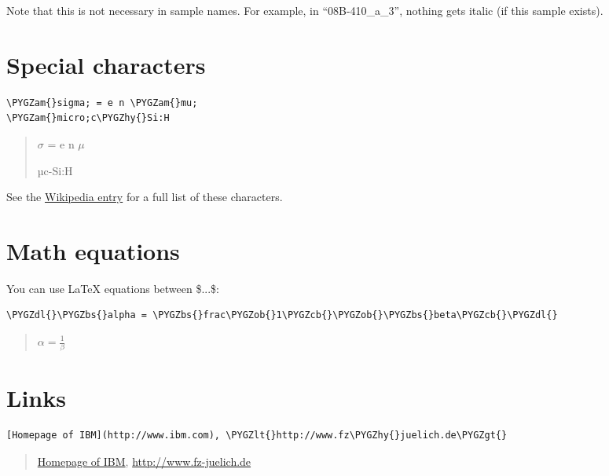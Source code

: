 \documentclass[a4paper,11pt,english]{sphinxmanual}
\def\PYGZbs{\char`\\}
\def\PYGZob{\char`\{}
\def\PYGZcb{\char`\}}
\def\PYGZam{\char`\&}
\def\PYGZlt{\char`\<}
\def\PYGZgt{\char`\>}
\def\PYGZdl{\char`\$}
\def\PYGZhy{\char`\-}
\begin{document}
Note that this is not necessary in sample names.  For example, in
“08B-410\_a\_3”, nothing gets italic (if this sample exists).


\section{Special characters}
\label{markdown:special-characters}
\begin{Verbatim}[commandchars=\\\{\},formatcom=\scriptsize]
\PYGZam{}sigma; = e n \PYGZam{}mu;
\PYGZam{}micro;c\PYGZhy{}Si:H
\end{Verbatim}
\begin{quote}

\begin{DUlineblock}{0em}
\item[] \(\sigma\) = e n \(\mu\)
\item[] µc-Si:H
\end{DUlineblock}
\end{quote}

See the \href{http://en.wikipedia.org/wiki/List\_of\_XML\_and\_HTML\_character\_entity\_references}{Wikipedia entry}
for a full list of these characters.


\section{Math equations}
\label{markdown:math-equations}\label{markdown:index-1}
You can use LaTeX equations between \$...\$:

\begin{Verbatim}[commandchars=\\\{\},formatcom=\scriptsize]
\PYGZdl{}\PYGZbs{}alpha = \PYGZbs{}frac\PYGZob{}1\PYGZcb{}\PYGZob{}\PYGZbs{}beta\PYGZcb{}\PYGZdl{}
\end{Verbatim}
\begin{quote}

\(\alpha = \frac{1}{\beta}\)
\end{quote}


\section{Links}
\label{markdown:links}
\begin{Verbatim}[commandchars=\\\{\},formatcom=\scriptsize]
[Homepage of IBM](http://www.ibm.com), \PYGZlt{}http://www.fz\PYGZhy{}juelich.de\PYGZgt{}
\end{Verbatim}
\begin{quote}

\href{http://www.ibm.com}{Homepage of IBM}, \href{http://www.fz-juelich.de}{http://www.fz-juelich.de}
\end{quote}
\end{document}
